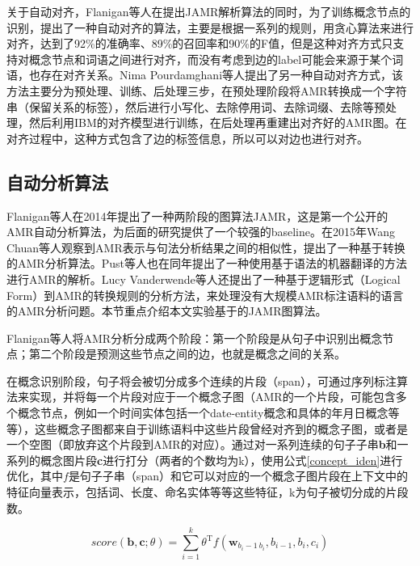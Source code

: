 \documentclass[master, winfont]{njuthesis}
\begin{document}
关于自动对齐，Flanigan等人\cite{Flanigan2014}在提出JAMR解析算法的同时，为了训练概念节点的识别，提出了一种自动对齐的算法，主要是根据一系列的规则，用贪心算法来进行对齐，达到了92\%的准确率、89\%的召回率和90\%的F值，但是这种对齐方式只支持对概念节点和词语之间进行对齐，而没有考虑到边的label可能会来源于某个词语，也存在对齐关系。Nima Pourdamghani等人\cite{Pourdamghani2014}提出了另一种自动对齐方式，该方法主要分为预处理、训练、后处理三步，在预处理阶段将AMR转换成一个字符串（保留关系的标签），然后进行小写化、去除停用词、去除词缀、去除等预处理，然后利用IBM的对齐模型进行训练，在后处理再重建出对齐好的AMR图。在对齐过程中，这种方式包含了边的标签信息，所以可以对边也进行对齐。

\subsection{自动分析算法}
\label{jamr}
Flanigan等人\cite{Flanigan2014}在2014年提出了一种两阶段的图算法JAMR，这是第一个公开的AMR自动分析算法，为后面的研究提供了一个较强的baseline。在2015年Wang Chuan\cite{Wang2015}等人观察到AMR表示与句法分析结果之间的相似性，提出了一种基于转换的AMR分析算法。Pust等人\cite{Pust2015}也在同年提出了一种使用基于语法的机器翻译的方法进行AMR的解析。Lucy Vanderwende等人\cite{Vanderwende2015}还提出了一种基于逻辑形式（Logical Form）到AMR的转换规则的分析方法，来处理没有大规模AMR标注语料的语言的AMR分析问题。本节重点介绍本文实验基于的JAMR图算法。

Flanigan等人\cite{Flanigan2014}将AMR分析分成两个阶段：第一个阶段是从句子中识别出概念节点；第二个阶段是预测这些节点之间的边，也就是概念之间的关系。

在概念识别阶段，句子将会被切分成多个连续的片段（span），可通过序列标注算法来实现，并将每一个片段对应于一个概念子图（AMR的一个片段，可能包含多个概念节点，例如一个时间实体包括一个date-entity概念和具体的年月日概念等等），这些概念子图都来自于训练语料中这些片段曾经对齐到的概念子图，或者是一个空图（即放弃这个片段到AMR的对应）。通过对一系列连续的句子子串\textbf{b}和一系列的概念图片段\textbf{c}进行打分（两者的个数均为k），使用公式\ref{concept_iden}进行优化，其中\textbf{$f$}是句子子串（span）和它可以对应的一个概念子图片段在上下文中的特征向量表示，包括词、长度、命名实体等等这些特征，k为句子被切分成的片段数。

\begin{equation}
	\label{concept_iden}
	score(\textbf{b}, \textbf{c}; \textbf{$\theta$})=\sum_{i=1}^{k}\textbf{$\theta$}^\mathrm{T}f(\textbf{w}_{b_i-1\:b_i}, b_{i-1}, b_i, c_i)
\end{equation}
\end{document}
